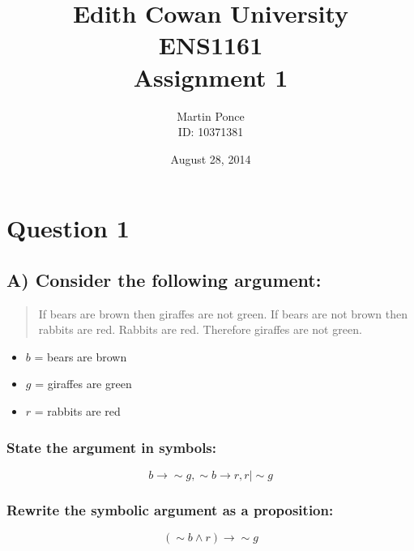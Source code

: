 \documentclass[12pt,a4paper]{article}
\title{Edith Cowan University\\ENS1161\\Assignment 1}
\author{Martin Ponce\\ID: 10371381}
\date{August 28, 2014}
\begin{document}


\newpage
\null  %
\nointerlineskip  %
\vfill
\let\snewpage \newpage
\let\newpage \relax
\maketitle
\thispagestyle{empty}
\let \newpage \snewpage
\vfill

\newpage
\tableofcontents

\newpage
\section{Question 1}

\subsection{A) Consider the following argument:}
\begin{quote}
If bears are brown then giraffes are not green. If bears are not brown then rabbits are red. Rabbits are red. Therefore giraffes are not green.
\end{quote}

\begin{itemize}
\item $b$ = bears are brown
\item $g$ = giraffes are green
\item $r$ = rabbits are red
\end{itemize}

\subsubsection{State the argument in symbols:}
$$b \rightarrow \sim{g}, \sim{b} \rightarrow r, r \mid \sim{g}$$

\subsubsection{Rewrite the symbolic argument as a proposition:}
$$(\sim{b} \wedge r) \rightarrow \sim{g}$$
\end{document}
